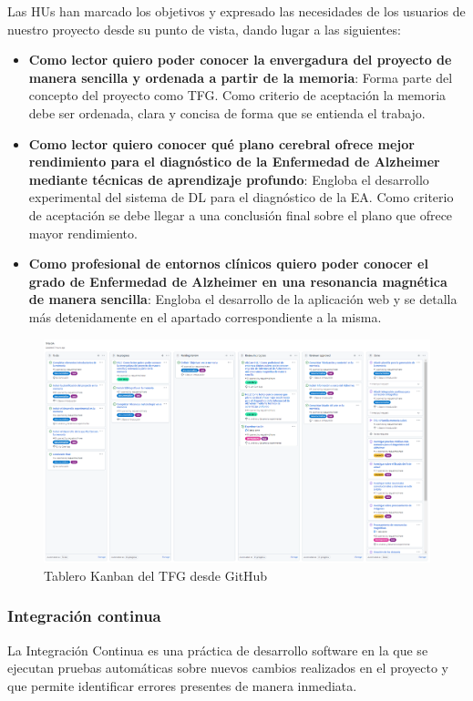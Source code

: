 Las HUs  han marcado los objetivos y expresado las necesidades de los usuarios de nuestro proyecto desde su punto de
vista, dando lugar a las siguientes:
\begin{itemize}
    \item \textbf{Como lector quiero poder conocer la envergadura del proyecto de manera sencilla y ordenada a partir de la
    memoria}: Forma parte del concepto del proyecto como TFG. Como criterio de aceptación la memoria debe ser ordenada,
    clara y concisa de forma que se entienda el trabajo.
    \item \textbf{Como lector quiero conocer qué plano cerebral ofrece mejor rendimiento para el diagnóstico de la Enfermedad de
    Alzheimer mediante técnicas de aprendizaje profundo}: Engloba el desarrollo experimental del sistema de DL para el
    diagnóstico de la EA. Como criterio de aceptación  se debe llegar a una conclusión final sobre el plano que ofrece
    mayor rendimiento.
    \item \textbf{Como profesional de entornos clínicos quiero poder conocer el grado de Enfermedad de Alzheimer en una
    resonancia magnética de manera sencilla}:  Engloba el desarrollo de la aplicación web y se detalla más detenidamente
    en el apartado correspondiente a la misma. \\
\end{itemize}

\begin{figure}[H]
    \centering
    \includegraphics[width=\textwidth]{./imgs/tablero-github}
    \caption{Tablero Kanban del TFG desde GitHub}
    \label{fig:tablero-kanban-github}
\end{figure}

\subsubsection{Integración continua}
La Integración Continua es una práctica de desarrollo software en la que se ejecutan pruebas automáticas sobre nuevos
cambios realizados en el proyecto y que permite identificar errores presentes de manera inmediata.

